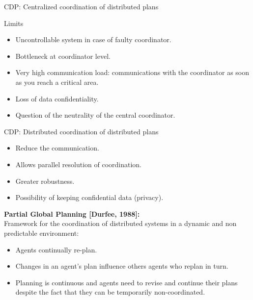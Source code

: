 \documentclass[9pt]{beamer}
\begin{document}
\begin{frame}{CDP: Centralized coordination of distributed plans}
\begin{small}

\begin{alertblock}{Limits}
\begin{itemize}
\item Uncontrollable system in case of faulty coordinator.
\item Bottleneck at coordinator level.
\item Very high communication load: communications with the coordinator as soon as you reach a critical area.
\item Loss of data confidentiality.
\item Question of the neutrality of the central coordinator.
\end{itemize}
\end{alertblock}

\end{small}
\end{frame}

\begin{frame}{CDP: Distributed coordination of distributed plans}
\begin{small}

\begin{itemize}
\item Reduce the communication.
\item Allows parallel resolution of coordination.
\item Greater robustness.
\item Possibility of keeping confidential data (privacy).
\end{itemize}

\pause

\vspace{4mm}

\textbf{Partial Global Planning [Durfee, 1988]:}\\
Framework for the coordination of distributed systems in a dynamic and non predictable environment: 
\vspace{-2mm}
\begin{itemize}
\item Agents continually re-plan.
\item Changes in an agent's plan influence others agents who replan in turn. 
\item Planning is continuous and agents need to revise and continue their plans despite the fact that they can be temporarily non-coordinated.
\end{itemize}

\end{small}
\end{frame}
\end{document}
